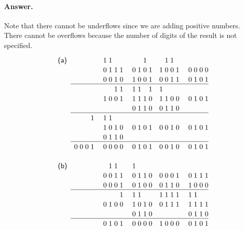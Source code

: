 \paragraph{Answer.} Note that there cannot be underflows since
we are adding positive numbers. There cannot be overflows because the
number of digits of the result is not specified.
\[
\renewcommand\arraystretch{0.85}
\setlength\extrarowheight{4pt}
\begin{array}{lc@{\;}c@{\;}c@{\;}c@{\;}cc@{\;}c@{\;}c@{\;}c@{\;}cc@{\;}c@{\;}c@{\;}cc@{}c@{\;}c@{\;}c@{\;}c@{\;}cc@{\;}c@{\;}c@{\;}c@{}}
\textsf{(a)} &  & & &  & & 1&1& &  & &  & &1&  & &  &1&1&  & &  & & &\\
             &  & & &  & & 0&1&1&1 & & 0&1&0&1 & & 1&0&0&1 & & 0&0&0&0\\
             &  & & &  & & 0&0&1&0 & & 1&0&0&1 & & 0&0&1&1 & & 0&1&0&1\\
\cline{2-25}
             &  & & &  & &  & &1&1 & & 1&1& &1 & & 1& & &  & &  & & &\\
             &  & & &  & & 1&0&0&1 & & 1&1&1&0 & & 1&1&0&0 & & 0&1&0&1\\
             &  & & &  & &  & & &  & & 0&1&1&0 & & 0&1&1&0 & &  & & &\\
\cline{2-25}
             &  & & &1 & & 1&1& &  & &  & & &  & &  & & &  & &  & & &\\
             &  & & &  & & 1&0&1&0 & & 0&1&0&1 & & 0&0&1&0 & & 0&1&0&1\\
             &  & & &  & & 0&1&1&0 & &  & & &  & &  & & &  & &  & & &\\
\cline{2-25}
             & 0&0&0&1 & & 0&0&0&0 & & 0&1&0&1 & & 0&0&1&0 & & 0&1&0&1\\\\
\textsf{(b)} &  & & &  & &  &1&1&  & & 1& & &  & &  & & &  & &  & & &\\
             &  & & &  & & 0&0&1&1 & & 0&1&1&0 & & 0&0&0&1 & & 0&1&1&1\\
             &  & & &  & & 0&0&0&1 & & 0&1&0&0 & & 0&1&1&0 & & 1&0&0&0\\
\cline{2-25}
             &  & & &  & &  & & &1 & & 1&1& &  & & 1&1&1&1 & & 1&1& &\\
             &  & & &  & & 0&1&0&0 & & 1&0&1&0 & & 0&1&1&1 & & 1&1&1&1\\
             &  & & &  & &  & & &  & & 0&1&1&0 & &  & & &  & & 0&1&1&0\\
\cline{2-25}
             &  & & &  & & 0&1&0&1 & & 0&0&0&0 & & 1&0&0&0 & & 0&1&0&1\\\\

\end{array}\]
